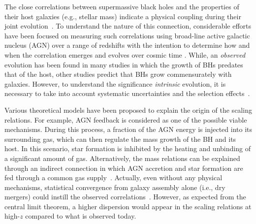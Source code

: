 \documentclass[twocolumn]{aastex631}
\begin{document}
The close correlations between supermassive black holes and the properties of their host galaxies (e.g., stellar mass) indicate a physical coupling during their joint evolution~\citep{Mag++98, F+M00, M+H03, H+R04, Gul++09}. To understand the nature of this connection, considerable efforts have been focused on measuring such correlations using broad-line active galactic nucleus (AGN) over a range of redshifts with the intention to determine how and when the correlation emerges and evolves over cosmic time \citep[e.g.,][]{Tre++04,Peng2006a, Tre++07, Woo++08, Jahnke2009, Bennert11, Schramm2013, Park15, Mechtley2016, Ding2020, 2021arXiv210902751L}. While, an {\it observed} evolution has been found in many studies in which the growth of BHs predates that of the host, other studies predict that BHs grow commensurately with galaxies.
However, to understand the significance {\it intrinsic} evolution, it is necessary to take into account systematic uncertainties and the selection effects~\citep{Tre++07, Lauer2007, Schulze2014, Park15}. 

Various theoretical models have been proposed to explain the origin of the scaling relations. For example, AGN feedback is considered as one of the possible viable mechanisms. During this process, a fraction of the AGN energy is injected into its surrounding gas, which can then regulate the mass growth of the BH and its host. In this scenario, star formation is inhibited by the heating and unbinding of a significant amount of gas. Alternatively, the mass relations can be explained through an indirect connection in which AGN accretion and star formation are fed through a common gas supply~\citep{Cen2015, Menci2016}. Actually, even without any physical mechanisms, statistical convergence from galaxy assembly alone (i.e., dry mergers) could instill the observed correlations~\citep{Peng2007, Jahnke2011, Hirschmann2010}. However, as expected from the central limit theorem, a higher dispersion would appear in the scaling relations at high-$z$ compared to what is observed today. 
\end{document}
